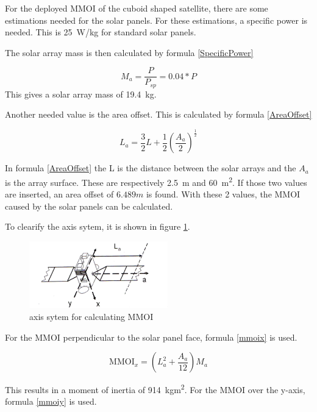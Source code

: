 For the deployed MMOI of the cuboid shaped satellite, there are some
estimations needed for the solar panels. For these estimations, a
specific power is needed. This is \SI{25}{W/kg} for standard solar
panels. \cite{wertz1999space}

The solar array mass is then calculated by formula \ref{SpecificPower}

\begin{equation}
  \label{SpecificPower}
  M_a=\frac{P}{P_{sp}}=0.04*P
\end{equation}
This gives a solar array mass of \SI{19.4}{kg}.

Another needed value is the area offset. This is calculated by formula \ref{AreaOffset}

\begin{equation}
  \label{AreaOffset}
  L_a=\frac{3}{2}L+\frac{1}{2} \left(\frac{A_a}{2} \right)^{\frac{1}{2}}
\end{equation}

In formula \ref{AreaOffset} the L is the distance between the solar
arrays and the $A_a$ is the array surface. These are respectively
\SI{2.5}{m} and \SI{60}{m^2}. If those two values are inserted, an
area offset of $6.489 m$ is found. With these 2 values, the MMOI
caused by the solar panels can be calculated.

To clearify the axis sytem, it is shown in figure
\ref{axissystemcuboid}.

\begin{figure}[h]
  \centering
  \includegraphics[width=6cm]	{axissystem}
  \caption{axis sytem for calculating MMOI}
  \label{axissystemcuboid}
\end{figure}

For the MMOI perpendicular to the solar panel face, formula
\ref{mmoix} is used.

\begin{equation}
  \label{mmoix}
  \mathrm{MMOI}_x=\left(L_a^2+\frac{A_a}{12}\right)M_a
\end{equation}

This results in a moment of inertia of \SI{914}{kgm^2}.  For the MMOI
over the y-axis, formula \ref{mmoiy} is used.

